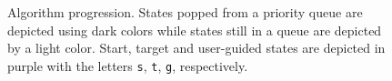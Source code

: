 \documentclass[conference]{IEEEtran}
\begin{document}
\begin{figure}[t]%
  \centering%
  \caption{%
    Algorithm progression.
    States popped from a priority queue are depicted using dark colors while states still in a queue are depicted by a light color.
    Start, target and user-guided states are depicted in purple with the letters \texttt{s}, \texttt{t}, \texttt{g}, respectively. 
}
\end{figure}
\end{document}
